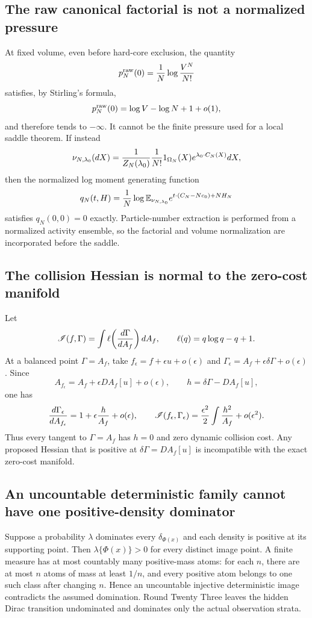 \subsection{The raw canonical factorial is not a normalized pressure}

At fixed volume, even before hard-core exclusion, the quantity
\[
 p_N^{\rm raw}(0)={1\over N}\log {V^N\over N!}
\]
satisfies, by Stirling's formula,
\[
 p_N^{\rm raw}(0)=\log V-\log N+1+o(1),
\]
and therefore tends to $-\infty$.  It cannot be the finite pressure used for
a local saddle theorem.  If instead
\[
 \nu_{N,\lambda_0}(dX)=
 {1\over Z_N(\lambda_0)}{1\over N!}
 1_{\Omega_N}(X)e^{\lambda_0\cdot C_N(X)}dX,
\]
then the normalized log moment generating function
\[
 q_N(t,H)={1\over N}\log
 \mathbb E_{\nu_{N,\lambda_0}}
 e^{t\cdot(C_N-Nc_0)+NH_N}
\]
satisfies $q_N(0,0)=0$ exactly.  Particle-number extraction is performed from
a normalized activity ensemble, so the factorial and volume normalization
are incorporated before the saddle.

\subsection{The collision Hessian is normal to the zero-cost manifold}

Let
\[
 \mathscr I(f,\Gamma)=\int
 \ell\!\left({d\Gamma\over dA_f}\right)dA_f,
 \qquad \ell(q)=q\log q-q+1.
\]
At a balanced point $\Gamma=A_f$, take
$f_\epsilon=f+\epsilon u+o(\epsilon)$ and
$\Gamma_\epsilon=A_f+\epsilon\delta\Gamma+o(\epsilon)$.  Since
\[
 A_{f_\epsilon}=A_f+\epsilon DA_f[u]+o(\epsilon),
 \qquad
 h=\delta\Gamma-DA_f[u],
\]
one has
\[
 {d\Gamma_\epsilon\over dA_{f_\epsilon}}
 =1+\epsilon{h\over A_f}+o(\epsilon),
 \qquad
 \mathscr I(f_\epsilon,\Gamma_\epsilon)
 ={\epsilon^2\over2}\int{h^2\over A_f}+o(\epsilon^2).
\]
Thus every tangent to $\Gamma=A_f$ has $h=0$ and zero dynamic collision cost.
Any proposed Hessian that is positive at
$\delta\Gamma=DA_f[u]$ is incompatible with the exact zero-cost manifold.

\subsection{An uncountable deterministic family cannot have one positive-density dominator}

Suppose a probability $\lambda$ dominates every
$\delta_{\Phi(x)}$ and each density is positive at its supporting point.  Then
$\lambda\{\Phi(x)\}>0$ for every distinct image point.  A finite measure has
at most countably many positive-mass atoms: for each $n$, there are at most
$n$ atoms of mass at least $1/n$, and every positive atom belongs to one such
class after changing $n$.  Hence an uncountable injective deterministic image
contradicts the assumed domination.  Round Twenty Three leaves the hidden
Dirac transition undominated and dominates only the actual observation
strata.

